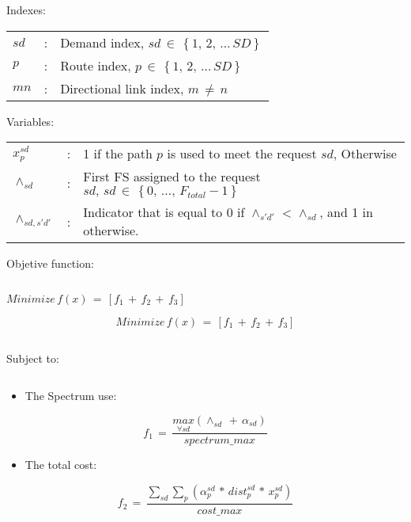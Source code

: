 \phantom{}

Indexes:

\begin{tabular}{lcl}
$sd$ & : & Demand index, $sd\,\in\,\left\{ 1,\,2,\,\ldots\,SD\right\} $\tabularnewline
$p$ & : & Route index, $p\,\in\,\left\{ 1,\,2,\,\ldots\,SD\right\} $\tabularnewline
$mn$ & : & Directional link index, $m\,\neq\,n$\tabularnewline
\end{tabular}

\phantom{}

Variables:

\begin{tabular}{lcl}
$x_{p}^{sd}$ & : & 1 if the path $p$ is used to meet the request $sd$, Otherwise \tabularnewline
$\wedge_{sd}$ & : & First FS assigned to the request $sd,\,sd\,\in\,\left\{ 0,\,\ldots,\,F_{total}-1\right\} $\tabularnewline
$\wedge_{sd,s'd'}$ & : & Indicator that is equal to 0 if $\wedge_{s'd'}$ < $\wedge_{sd}$,
and 1 in otherwise. \tabularnewline
\end{tabular}

\phantom{}

Objetive function:

\[
\;
\]

$Minimize\,f\left(x\right)\,=\,\left[f_{1}\,+\,f_{2}\,+\,f_{3}\right]$

\begin{equation}
Minimize\,f\left(x\right)\,=\,\left[f_{1}\,+\,f_{2}\,+\,f_{3}\right]\label{eq:func_obj}
\end{equation}

\[
\;
\]

Subject to:

\[
\:
\]

\begin{itemize}
\item The Spectrum use:
\end{itemize}
\begin{equation}
f_{1}\,=\,\frac{\underset{\forall sd}{max}\left(\wedge_{sd}\,+\,\alpha_{sd}\right)}{spectrum\_max}\label{eq:uso_espectro_func}
\end{equation}

\begin{itemize}
\item The total cost:
\end{itemize}
\begin{equation}
f_{2}\,=\,\frac{\sum_{sd}\sum_{p}\left(\alpha_{p}^{sd}\,*\,dist_{p}^{sd}\,*\,x_{p}^{sd}\right)}{cost\_max}\label{eq:total_costo_func}
\end{equation}

